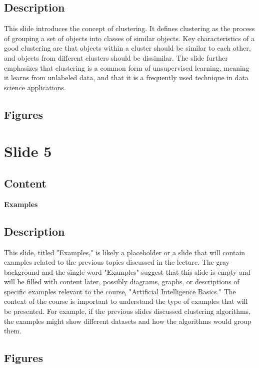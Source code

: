 \documentclass{article}%
\begin{document}
\subsection{Description}%
This slide introduces the concept of clustering.  It defines clustering as the process of grouping a set of objects into classes of similar objects.  Key characteristics of a good clustering are that objects within a cluster should be similar to each other, and objects from different clusters should be dissimilar.  The slide further emphasizes that clustering is a common form of unsupervised learning, meaning it learns from unlabeled data, and that it is a frequently used technique in data science applications.%
\subsection{Figures}%
\begin{figure}[H]%
\centering%
\end{figure}

%
\newpage%
\section{Slide 5}%
\label{sec:Slide5}%
\subsection{Content}%

\textbf{Examples}
%
\subsection{Description}%
This slide, titled "Examples," is likely a placeholder or a slide that will contain examples related to the previous topics discussed in the lecture.  The gray background and the single word "Examples" suggest that this slide is empty and will be filled with content later, possibly diagrams, graphs, or descriptions of specific examples relevant to the course, "Artificial Intelligence Basics."  The context of the course is important to understand the type of examples that will be presented.  For example, if the previous slides discussed clustering algorithms, the examples might show different datasets and how the algorithms would group them.%
\subsection{Figures}%
\begin{figure}[H]%
\centering%
\end{figure}
\end{document}

